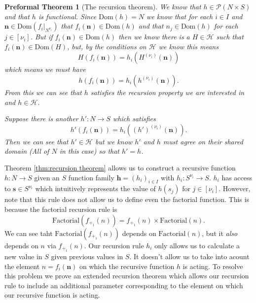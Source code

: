 \documentclass[oneside, 12pt]{book}
\theoremstyle{break}
\newtheorem{preformal definition}[definition]{Preformal Definition}
\newtheorem{preformal theorem}[theorem]{Preformal Theorem}
\newcommand{\bv}[1]{\boldsymbol{#1}}
\newcommand{\mc}[1]{\mathcal{#1}}
\begin{document}
\begin{preformal theorem}[The recursion theorem]
				We know that $h\in \mc{P}(N\times S)$ and that $h$ is functional.
				Since $\text{Dom}(h) = N$ we know that for each $i\in I$ and $\bv{n}\in\text{Dom}(f_i|_{N^{\nu_i}})$ that $f_i(\bv{n}) \in \text{Dom}(h)$ and that $n_j \in \text{Dom}(h)$ for each $j\in [\nu_i]$.
				But if $f_i(\bv{n}) \in \text{Dom}(h)$ then we know there is a $H\in \mc{H}$ such that $f_i(\bv{n})\in \text{Dom}(H)$, but, by the conditions on $\mc{H}$ we know this means
				\begin{equation*}
					H(f_i(\bv{n})) = h_i\left(H^{(\nu_i)}(\bv{n})\right)
				\end{equation*}
				which means we must have
				\begin{equation*}
					h(f_i(\bv{n})) = h_i\left(h^{(\nu_i)}(\bv{n})\right).
				\end{equation*}
				From this we can see that $h$ satisfies the recursion property we are interested in and $h \in \mc{H}$.
				
				Suppose there is another $h':N\to S$ which satisfies
				\begin{equation*}
					h'(f_i(\bv{n})) = h_i\left((h')^{(\nu_i)}(\bv{n})\right).
				\end{equation*}
				Then we can see that $h' \in \mc{H}$ but we know $h'$ and $h$ must agree on their shared domain (All of $N$ in this case) so that $h' = h$.
			\end{preformal theorem}
	
			Theorem \ref{thm:recursion theorem} allows us to construct a recursive function $h: N \to S$ given an $S$ function family $\bv{h} = (h_i)_{i\in I}$ with $h_i:S^{\nu_i} \to S$.
			$h_i$ has access to $\bv{s} \in S^{\nu_i}$ which intuitively represents the value of $h(s_j)$ for $j\in [\nu_i]$.
			However, note that this rule does not allow us to define even the factorial function.
			This is because the factorial recursion rule is
			\begin{equation*}
				\text{Factorial}(f_{+_1}(n)) = f_{+_1}(n) \times \text{Factorial}(n).
			\end{equation*}
			We can see taht $\text{Factorial}(f_{+_1}(n))$ depends on $\text{Factorial}(n)$, but it \textit{also} depends on $n$ via $f_{+_1}(n)$.
			Our recursion rule $h_i$ only allows us to calculate a new value in $S$ given previous values in $S$.
			It doesn't allow us to take into acount the element $n = f_i(\bv{n})$ on which the recursive function $h$ is acting.
			To resolve this problem we prove an extended recursion theorem which allows our recursion rule to include an additional parameter corresponding to the element on which our recursive function is acting.
		
\end{document}
